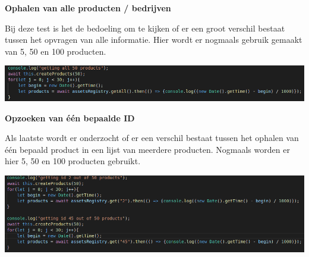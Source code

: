 \documentclass[fleqn,a4paper,12pt]{book}
\begin{document}
\textbf{Ophalen van alle producten / bedrijven}

Bij deze test is het de bedoeling om te kijken of er een groot verschil bestaat tussen het opvragen van alle informatie. Hier wordt er nogmaals gebruik gemaakt van 5, 50 en 100 producten.

\begin{center}
	\includegraphics[width=14cm]{img/test-function-getAllProducts}\\[1cm]
\end{center}

\textbf{Opzoeken van één bepaalde ID}

Als laatste wordt er onderzocht of er een verschil bestaat tussen het ophalen van één bepaald product in een lijst van meerdere producten. Nogmaals worden er hier 5, 50 en 100 producten gebruikt.

\begin{center}
	\includegraphics[width=14cm]{img/test-function-getID}\\[1cm]
\end{center}
\end{document}
